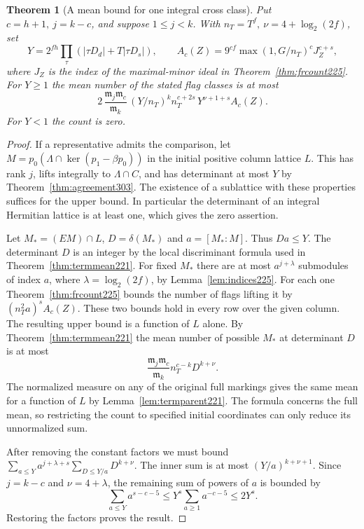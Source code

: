 \documentclass[a4paper,11pt]{article}
\newtheorem{theorem}[proposition]{Theorem}
\theoremstyle{definition}
\theoremstyle{remark}
\numberwithin{equation}{section}
\begin{document}
\begin{theorem}[A mean bound for one integral cross class]\leavevmode
\label{thm:singlemean303}
Put \(c=h+1,\ j=k-c\), and suppose \(1\le j<k\). With
\(n_T=T^f,\ \nu=4+\log_2(2f)\), set
\[
    Y=2^{fh}\prod_\tau (|\tau D_d|+T|\tau D_s|),\qquad
    A_c(Z)=9^{cf}\max(1,G/n_T)^c J_Z^{c+s},
\]
where \(J_Z\) is the index of the maximal-minor ideal
in Theorem~\ref{thm:frcount225}. For \(Y\ge1\) the mean
number of the stated flag classes is at most
\[
       2\,\frac{\mathfrak m_j\mathfrak m_c}{\mathfrak m_k}\,
       (Y/n_T)^k n_T^{c+2s}\,Y^{\nu+1+s} A_c(Z).
\]
For \(Y<1\) the count is zero.
\end{theorem}
\begin{proof}
If a representative admits the comparison, let
\(M=p_0(\Lambda\cap\ker(p_1-\beta p_0))\) in the initial
positive column lattice \(L\). This has rank \(j\), lifts
integrally to \(\Lambda\cap C\), and has determinant at
most \(Y\) by Theorem~\ref{thm:agreement303}.
The existence of a sublattice with these properties suffices
for the upper bound. In particular the determinant of an
integral Hermitian lattice is at least one, which gives
the zero assertion.

Let \(M_*=(EM)\cap L\), \(D=\delta(M_*)\) and
\(a=[M_*:M]\). Thus \(Da\le Y\). The determinant \(D\)
is an integer by the local discriminant formula used in
Theorem~\ref{thm:termmean221}. For fixed \(M_*\) there
are at most \(a^{j+\lambda}\) submodules of index \(a\),
where \(\lambda=\log_2(2f)\), by Lemma~\ref{lem:indices225}.
For each one Theorem~\ref{thm:frcount225} bounds the
number of flags lifting it by \((n_T^2 a)^s A_c(Z)\).
These two bounds hold in every row over the given column.
The resulting upper bound is a function of \(L\) alone.
By Theorem~\ref{thm:termmean221} the mean number of
possible \(M_*\) at determinant \(D\) is at most
\[
       \frac{\mathfrak m_j\mathfrak m_c}{\mathfrak m_k}
                   n_T^{c-k}D^{k+\nu}.
\]
The normalized measure on any of the original full
markings gives the same mean for a function of \(L\)
by Lemma~\ref{lem:termparent221}. The formula concerns
the full mean, so restricting the count to specified
initial coordinates can only reduce its unnormalized sum.

After removing the constant factors we must bound
\(\sum_{a\le Y}a^{j+\lambda+s}
\sum_{D\le Y/a}D^{k+\nu}\). The inner sum is at most
\((Y/a)^{k+\nu+1}\). Since \(j=k-c\) and
\(\nu=4+\lambda\), the remaining sum of powers of \(a\)
is bounded by
\[
       \sum_{a\le Y} a^{s-c-5}
              \le Y^s\sum_{a\ge1}a^{-c-5}\le 2Y^s .
\]
Restoring the factors proves the result.
\end{proof}
\end{document}
